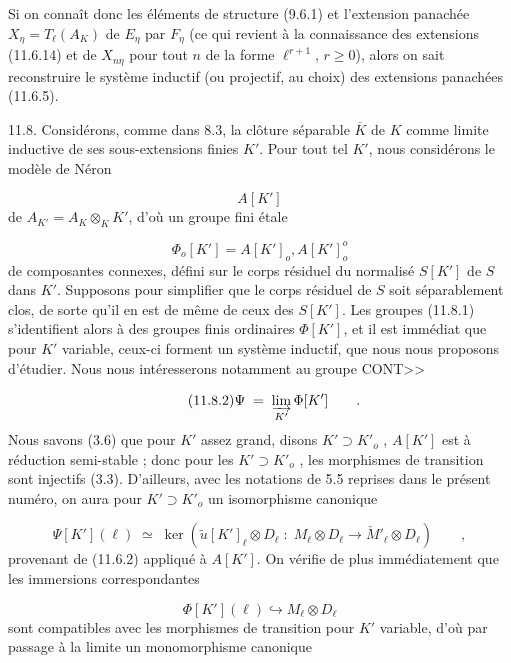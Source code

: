 Si on connaît donc les éléments de structure (9.6.1) et l'extension panachée $X_\eta = T_\ell(A_K)$ de $E_\eta$ par $F_\eta$ (ce qui revient à la connaissance des extensions (11.6.14) et de $X_{n\eta}$ pour tout $n$ de la forme $\ell^{r+1}$, $r \geq 0$), alors on sait reconstruire le système inductif (ou projectif, au choix) des extensions panachées (11.6.5).

11.8. Considérons, comme dans 8.3, la clôture séparable $\overline{K}$ de $K$ comme limite inductive de ses sous-extensions finies $K'$. Pour tout tel $K'$, nous considérons le modèle de Néron

\begin{equation*}
A[K']
\end{equation*}
de $A_{K'} = A_K \otimes_K K'$, d'où un groupe fini étale

\begin{equation}\tag{11.8.1}
\Phi_o[K'] = A[K']_o , A[K']_o^o
\end{equation}
de composantes connexes, défini sur le corps résiduel du normalisé $S[K']$ de $S$ dans $K'$. Supposons pour simplifier que le corps résiduel de $S$ soit séparablement clos, de sorte qu'il en est de même de ceux des $S[K']$. Les groupes (11.8.1) s'identifient alors à des groupes finis ordinaires $\Phi[K']$, et il est immédiat que pour $K'$ variable, ceux-ci forment un système inductif, que nous nous proposons d'étudier. Nous nous intéresserons notamment au groupe CONT>>



\begin{equation}\tag{11.8.2}
\Psi \;=\; \varinjlim_{K'} \Phi[K'] \qquad .
\end{equation}
Nous savons (3.6) que pour $K'$ assez grand, disons $K' \supset K'_o$ , $A[K']$ est à réduction semi-stable ; donc pour les $K' \supset K'_o$ , les morphismes de transition sont injectifs (3.3). D'ailleurs, avec les notations de 5.5 reprises dans le présent numéro, on aura pour $K' \supset K'_o$ un isomorphisme canonique

\begin{equation}\tag{11.8.3}
\Psi[K'](\ell) \;\simeq\; \ker(\widetilde{u}[K']_\ell \otimes D_\ell \;:\; M_\ell \otimes D_\ell \longrightarrow \check{M}'_\ell \otimes D_\ell) \qquad ,
\end{equation}
provenant de (11.6.2) appliqué à $A[K']$. On vérifie de plus immédiatement que les immersions correspondantes

\begin{equation*}
\Phi[K'](\ell) \hookrightarrow M_\ell \otimes D_\ell
\end{equation*}
sont compatibles avec les morphismes de transition pour $K'$ variable, d'où par passage à la limite un monomorphisme canonique

